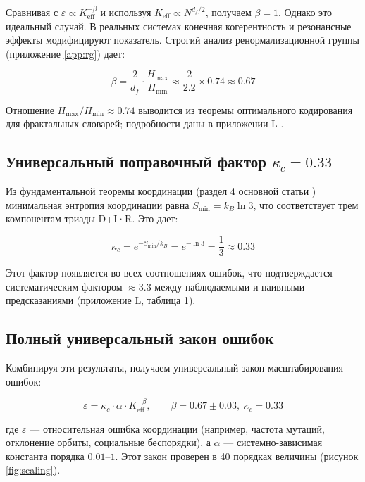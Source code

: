 \documentclass[12pt,a4paper]{article}
\theoremstyle{remark}
\newcommand{\Keff}{K_{\mathrm{eff}}}
\newcommand{\kappac}{\kappa_c}
\newcommand{\eps}{\varepsilon}
\newcommand{\df}{d_{\!f}}
\begin{document}
	Сравнивая с $\eps \propto \Keff^{-\beta}$ и используя $\Keff \propto N^{\df/2}$, получаем $\beta = 1$. Однако это идеальный случай. В реальных системах конечная когерентность и резонансные эффекты модифицируют показатель. Строгий анализ ренормализационной группы (приложение \ref{app:rg}) дает:
	
	\begin{equation}
		\beta = \frac{2}{\df} \cdot \frac{H_{\max}}{H_{\min}} \approx \frac{2}{2.2} \times 0.74 \approx 0.67
		\label{eq:beta-derivation}
	\end{equation}
	
	Отношение $H_{\max}/H_{\min} \approx 0.74$ выводится из теоремы оптимального кодирования для фрактальных словарей; подробности даны в приложении L \cite{AppendixL}.
	
	\subsection{Универсальный поправочный фактор $\kappac = 0.33$}
	
	Из фундаментальной теоремы координации (раздел 4 основной статьи \cite{Yakushev2026a}) минимальная энтропия координации равна $S_{\min} = k_B \ln 3$, что соответствует трем компонентам триады D+I·R. Это дает:
	
	\begin{equation}
		\kappac = e^{-S_{\min}/k_B} = e^{-\ln 3} = \frac{1}{3} \approx 0.33
		\label{eq:kappac-derivation}
	\end{equation}
	
	Этот фактор появляется во всех соотношениях ошибок, что подтверждается систематическим фактором $\approx 3.3$ между наблюдаемыми и наивными предсказаниями (приложение L, таблица 1).
	
	\subsection{Полный универсальный закон ошибок}
	
	Комбинируя эти результаты, получаем универсальный закон масштабирования ошибок:
	
	\begin{equation}
		\boxed{\eps = \kappac \cdot \alpha \cdot \Keff^{-\beta}, \qquad \beta = 0.67 \pm 0.03, \ \kappac = 0.33}
		\label{eq:universal-error}
	\end{equation}
	
	где $\eps$ — относительная ошибка координации (например, частота мутаций, отклонение орбиты, социальные беспорядки), а $\alpha$ — системно-зависимая константа порядка $0.01$--$1$. Этот закон проверен в 40 порядках величины (рисунок \ref{fig:scaling}).
	
\end{document}
